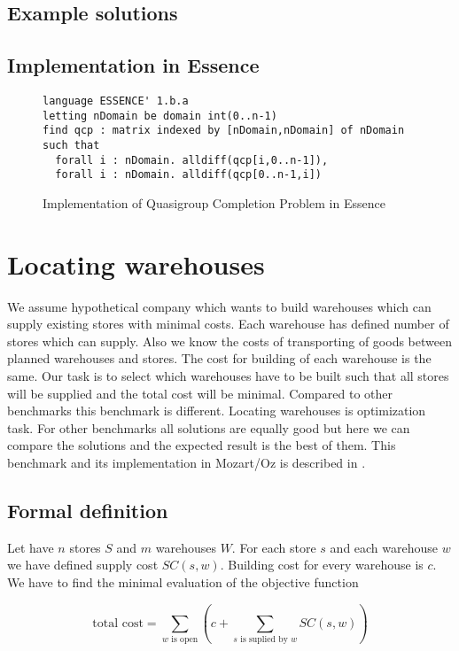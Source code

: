 \subsection{Example solutions}

\subsection{Implementation in Essence}


\lstset{         %
  language=C++,
	basicstyle=\tiny,
  keywordstyle=\bfseries,
  identifierstyle=\itshape,
  stringstyle=\ttfamily,
  numbers=none,
  numberstyle=\tiny,
  numbersep=5pt,
  frameround=ffff,
  extendedchars=true,
  tab=~,
  tabsize=2,
  frame=single,
  captionpos=b,
  showspaces=false,
  showstringspaces=false,
  breaklines=true
}


\begin{figure}[ht]
\caption{Implementation of Quasigroup Completion Problem in Essence}
\begin{lstlisting}
language ESSENCE' 1.b.a
letting nDomain be domain int(0..n-1)
find qcp : matrix indexed by [nDomain,nDomain] of nDomain
such that
  forall i : nDomain. alldiff(qcp[i,0..n-1]),
  forall i : nDomain. alldiff(qcp[0..n-1,i])
\end{lstlisting} 
\end{figure}


\section{Locating warehouses}
We assume hypothetical company which wants to build warehouses which can supply existing stores with minimal costs. Each warehouse has defined number of stores which can supply. Also we know the costs of transporting of goods between planned warehouses and stores. The cost for building of each warehouse is the same. Our task is to select which warehouses have to be built such that all stores will be supplied and the total cost will be minimal. Compared to other benchmarks this benchmark is different. Locating warehouses is optimization task. For other benchmarks all solutions are equally good but here we can compare the solutions and the expected result is the best of them. This benchmark and its implementation in Mozart/Oz is described in \cite{mozart:documentation}.

\subsection{Formal definition}
Let have $n$ stores $S$ and $m$ warehouses $W$. For each store $s$ and each warehouse $w$ we have defined supply cost $SC(s,w)$. Building cost for every warehouse is $c$. We have to find the minimal evaluation of the objective function 

$$ \text{total cost} = \sum_{w \text{ is open}}\left(c + \sum_{s \text{ is suplied by } w}{SC(s,w)} \right) $$ 

